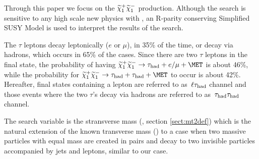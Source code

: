 Through this paper we focus on the $\widetilde{\chi}_{1}^{+}\widetilde{\chi}_{1}^{-}$ production. 
Although the search is sensitive to any high scale 
new physics with \MET, an R-parity conserving Simplified SUSY Model \cite{Alwall:2008ag,alves:sms} is used 
to interpret the results of the search.

The $\tau$ leptons decay leptonically ($e$ or $\mu$), in 35\% of the time, or decay via hadrons, which occurs in 65\% of the cases. Since there are two $\tau$ leptons in the final state, the probability of having $\PSGcpDo\PSGcmDo \rightarrow \hadtau+e/\mu+\MET$ is about 46\%, while the probability for $\PSGcpDo\PSGcmDo \rightarrow \hadtau+\hadtau+\MET$ to occur is about 42\%. Hereafter, final states containing a lepton are referred to as $\,\ell\tau_{\rm had}$ channel and those events where the two $\tau$'s decay via hadrons are referred to as $\,\tau_{\rm had}\tau_{\rm had}$ channel. 

The search variable is the stransverse mass (\mttwo, section \ref{sect:mt2def}) 
which is the natural extension of the known transverse mass (\mt) to a case 
when two massive particles with equal mass are created in pairs and decay 
to two invisible particles accompanied by jets and leptons, similar to our case.

